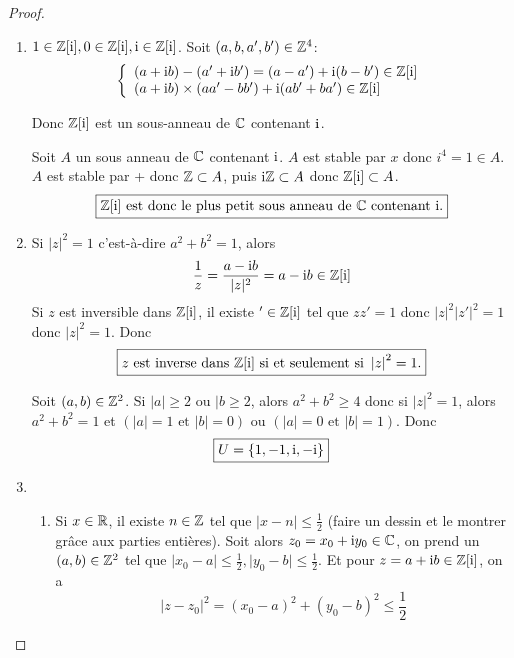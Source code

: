 \documentclass[12pt]{article}
\begin{document}
\begin{proof}
	\phantom{}
	\begin{enumerate}
		\item $1\in\mathbb{Z}[\mathrm{i}],0\in\mathbb{Z}[\mathrm{i}],\mathrm{i}\in\mathbb{Z}[\mathrm{i}]$. Soit $(a,b,a',b')\in\mathbb{Z}^{4}$:
		\begin{equation}
			\left\{
				\begin{array}[]{l}
					(a+\i b)-(a'+\i b')=(a-a')+\i(b-b')\in\Z[\i]\\
					(a+\i b)\times (aa'-bb')+\i(ab'+ba')\in\Z[\i]
				\end{array}
			\right.
		\end{equation}
		
		Donc $\mathbb{Z}[\mathrm{i}]$ est un sous-anneau de $\mathbb{C}$ contenant $\mathrm{i}$.

		Soit $A$ un sous anneau de $\mathbb{C}$ contenant $\mathrm{i}$. $A$ est stable par $x$ donc $i^{4}=1\in A$. $A$ est stable par + donc $\mathbb{Z}\subset A$, puis $\mathrm{i}\mathbb{Z}\subset A$ donc $\mathbb{Z}[\mathrm{i}]\subset A$. 
		\begin{equation}
			\boxed{\mathbb{Z}[\mathrm{i}]\text{ est donc le plus petit sous anneau de }\mathbb{C}\text{ contenant }\mathrm{i}.}
		\end{equation}

		\item Si $\vert z\vert^{2}=1$ c'est-à-dire $a^{2}+b^{2}=1$, alors 
		\begin{equation}
			\frac{1}{z}=\frac{a-\mathrm{i} b}{\vert z\vert^{2}}=a-\mathrm{i} b\in\mathbb{Z}[\mathrm{i}]
		\end{equation}
		Si $z$ est inversible dans $\mathbb{Z}[\mathrm{i}]$, il existe $'\in\mathbb{Z}[\mathrm{i}]$ tel que $zz'=1$ donc $\vert z\vert^{2}\vert z'\vert^{2}=1$ donc $\vert z\vert^{2}=1$. Donc 
		\begin{equation}
			\boxed{z\text{ est inverse dans }\mathbb{Z}[\mathrm{i}]\text{ si et seulement si }\left\lvert z\right\rvert^{2}=1.}
		\end{equation}

		Soit $(a,b)\in\mathbb{Z}^{2}$. Si $\vert a\vert\geqslant2$ ou $\vert b\geqslant2$, alors $a^{2}+b^{2}\geqslant4$ donc si $\vert z\vert^{2}=1$, alors $a^{2}+b^{2}=1$ et $\left(\vert a\vert=1\text{ et }\vert b\vert=0\right)$ ou $\left(\vert a\vert=0\text{ et }\vert b\vert=1\right)$. Donc 
		\begin{equation}
			\boxed{U=\left\{1,-1,\mathrm{i},-\mathrm{i}\right\}}
		\end{equation}

		\item 
		\begin{enumerate}
			\item Si $x\in\mathbb{R}$, il existe $n\in\mathbb{Z}$ tel que $\vert x-n\vert\leqslant\frac{1}{2}$ (faire un dessin et le montrer grâce aux parties entières). Soit alors $z_{0}=x_{0}+\mathrm{i} y_{0}\in\mathbb{C}$, on prend un $(a,b)\in\mathbb{Z}^{2}$ tel que $\vert x_{0}-a\vert\leqslant\frac{1}{2},\vert y_{0}-b\vert\leqslant\frac{1}{2}$. Et pour $z=a+\mathrm{i} b\in\mathbb{Z}[\mathrm{i}]$, on a 
			\begin{equation}
				\boxed{\vert z-z_{0}\vert^{2}=(x_{0}-a)^{2}+(y_{0}-b)^{2}\leqslant\frac{1}{2}}
			\end{equation}
			

\end{enumerate}
\end{enumerate}
\end{proof}
\end{document}
